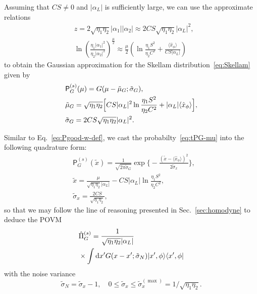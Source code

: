 \documentclass[%
reprint,
superscriptaddress,
 amsmath,amssymb,amsfonts,
 aps,
 pra,
 longbibliography
]{revtex4-2}
\newcommand{\avr}[1]{\ensuremath{\langle{#1}\rangle}}
\newcommand{\prob}{\mathsf{P}}
\newcommand{\dd}{\mathrm{d}}
\begin{document}
Assuming that $CS\ne 0$ and $|\alpha_L|$ is sufficiently large,
we can use the approximate relations
\begin{align}
  &
    \label{eq:z1-A}
    z=2\sqrt{\eta_1\eta_2}|\alpha_1||\alpha_2|
    \approx
    2CS\sqrt{\eta_1\eta_2}|\alpha_L|^2,
  \\
  &
    \label{eq:z2-A}
    \ln \left(\frac{{\eta_1}|\alpha_1|^2}{{\eta_2}|\alpha_2|^2}\right)^{\frac{\mu}{2}}\approx
    \frac{\mu}{2}\left(
    \ln\frac{\eta_1S^2}{\eta_2C^2}+\frac{\langle\hat{x}_\phi\rangle}{CS|\alpha_L|}\right)
    \end{align}
    to obtain the Gaussian approximation for the Skellam distribution~\eqref{eq:Skellam}
    given by
\begin{align}
  &
  \label{eq:tPG-mu}
        {\prob}_G^{(s)}(\mu)=G(\mu-\tilde{\mu}_G;\tilde{\sigma}_G),
  \\
  &
  \label{eq:tmu_G}
  \tilde{\mu}_G=\sqrt{\eta_1\eta_2}\Bigl[
  CS |\alpha_L|^2\ln\frac{\eta_1S^2}{\eta_2C^2}+
  |\alpha_L|\avr{\hat{x}_{\phi}}
  \Bigr],
  \\
  &
      \label{eq:tsgm_G}
    \tilde{\sigma}_G=
    2CS\sqrt{\eta_1\eta_2}|\alpha_L|^2.
\end{align}



Similar to Eq.~\eqref{eq:Pgood-w-def},
we cast the probabilty~\eqref{eq:tPG-mu}
into the following quadrature form: 
\begin{align}
  &
    \label{eq:tPG-tx}
{\prob}_G^{(s)}(\tilde{x})=\frac{1}{\sqrt{2\pi\tilde{\sigma}_G}}
    \exp \biggl\{-\frac{(\tilde{x}-\avr{\hat{x}_\phi})^2}{2\tilde{\sigma}_x}\biggr\},
  \\
  &
    \label{eq:tld-x}
    \tilde{x}=\frac{\mu}{{\sqrt{\eta_1\eta_2}|\alpha_L|}}-
    CS|\alpha_L|\ln\frac{\eta_1S^2}{\eta_2C^2},
    \\
  &
    \label{eq:tsgm_x}
    \tilde{\sigma}_x=\frac{2CS}{\sqrt{\eta_1\eta_2}},
\end{align}
so that we may follow the line of reasoning
presented in Sec.~\ref{sec:homodyne} to deduce the POVM
\begin{align}
  &
\label{eq:tpovm}    
    \hat{\Pi}_G^{(s)}=\frac{1}{\sqrt{\eta_1\eta_2}|\alpha_L|}
    \notag
  \\
  &
    \times
    \int \dd x' G(x-x'; \tilde{\sigma}_N)|x',\phi\rangle\langle x',\phi|
\end{align}
with the noise variance
\begin{equation}
  \label{eq:tsigm-N}
  \tilde{\sigma}_N=\tilde{\sigma}_x-1,
  \quad
  0 \le \tilde{\sigma}_x\le \tilde{\sigma}_x^{(\max)}=1/\sqrt{\eta_1\eta_2}.
\end{equation}
\end{document}
